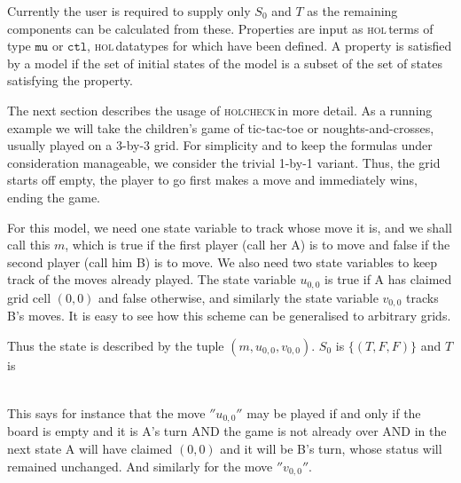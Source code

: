 \documentclass{article}
\newcommand{\hc}{\textsc{holcheck\,}}
\newcommand{\hol}{\textsc{hol\,}}
\begin{document}
Currently the user is required to supply only \( S_0 \) and \( T \) as the remaining components can be calculated from these. Properties are input as \hol terms of type \(\mathtt{mu}\) or \(\mathtt{ctl}\), \hol datatypes for which have been defined. A property is satisfied by a model if the set of initial states of the model is a subset of the set of states satisfying the property. 

The next section describes the usage of \hc in more detail. As a running example we will take the children's game of tic-tac-toe or noughts-and-crosses, usually played on a 3-by-3 grid. For simplicity and to keep the formulas under consideration manageable, we consider the trivial 1-by-1 variant. Thus, the grid starts off empty, the player to go first makes a move and immediately wins, ending the game.

For this model, we need one state variable to track whose move it is, and we shall call this \(m\), which is true if the first player (call her A) is to move and false if the second player (call him B) is to move. We also need two state variables to keep track of the moves already played. The state variable \(u_{0,0}\) is true if A has claimed grid cell \((0,0)\) and false otherwise, and similarly the state variable \(v_{0,0}\) tracks B's moves. It is easy to see how this scheme can be generalised to arbitrary grids.

Thus the state is described by the tuple \( (m,u_{0,0},v_{0,0}) \). \(S_0\) is \( \{ (T,F,F) \} \) and \( T \) is 

\begin{eqnarray*}
 [&(&''{u_{0,0}}'',(\lnot u_{0,0} \land \lnot v_{0,0} \land m) \land \lnot((\lnot m \land u_{0,0}) \lor (m \land v_{0,0}))\\
       &&\land (u_{0,0}' \land \lnot m' \land (v_{0,0}' = v_{0,0}))),\\
     &(&''{v_{0,0}}'',(\lnot v_{0,0} \land \lnot u_{0,0} \land \lnot m) \land \lnot((\lnot m \land u_{0,0}) \lor (m \land v_{0,0}))\\
        &&\land (v_{0,0}' \land m' \land (u_{0,0}' = u_{0,0})))]
\end{eqnarray*}

This says for instance that the move \(''{u_{0,0}}''\) may be played if and only if the board is empty and it is A's turn AND the game is not already over AND in the next state A will have claimed \((0,0)\) and it will be B's turn, whose status will remained unchanged. And similarly for the move \(''{v_{0,0}}''\). 
\end{document}
